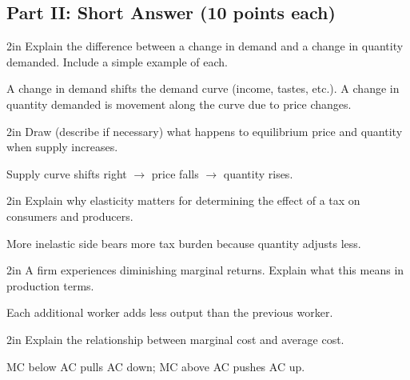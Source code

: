 \documentclass[12pt]{exam}
\begin{document}
\begin{questions}
    \section*{Part II: Short Answer (10 points each)}

    \begin{shortanswer}[10]{2in}
        Explain the difference between a change in demand and a change in quantity demanded. Include a simple example of each.
    \end{shortanswer}
    \begin{solution}
        A change in demand shifts the demand curve (income, tastes, etc.). A change in quantity demanded is movement along the curve due to price changes.
    \end{solution}

    \begin{shortanswer}[10]{2in}
        Draw (describe if necessary) what happens to equilibrium price and quantity when supply increases.
    \end{shortanswer}
    \begin{solution}
        Supply curve shifts right $\rightarrow$ price falls $\rightarrow$ quantity rises.
    \end{solution}

    \begin{shortanswer}[10]{2in}
        Explain why elasticity matters for determining the effect of a tax on consumers and producers.
    \end{shortanswer}
    \begin{solution}
        More inelastic side bears more tax burden because quantity adjusts less.
    \end{solution}

    \begin{shortanswer}[10]{2in}
        A firm experiences diminishing marginal returns. Explain what this means in production terms.
    \end{shortanswer}
    \begin{solution}
        Each additional worker adds less output than the previous worker.
    \end{solution}

    \begin{shortanswer}[10]{2in}
        Explain the relationship between marginal cost and average cost.
    \end{shortanswer}
    \begin{solution}
        MC below AC pulls AC down; MC above AC pushes AC up.
    \end{solution}


\end{questions}
\end{document}

